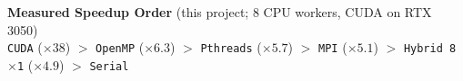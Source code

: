 \documentclass[12pt,a4paper]{report}
\begin{document}
\vspace{1em}
\begin{center}
\textbf{Measured Speedup Order} (this project; 8 CPU workers, CUDA on RTX 3050)\\[0.5em]
\texttt{CUDA} ($\times38$) $>$ \texttt{OpenMP} ($\times6.3$) $>$ \texttt{Pthreads} ($\times5.7$)
$>$ \texttt{MPI} ($\times5.1$) $>$ \texttt{Hybrid\,8$\times$1} ($\times4.9$) $>$ \texttt{Serial}
\end{center}
\end{document}
